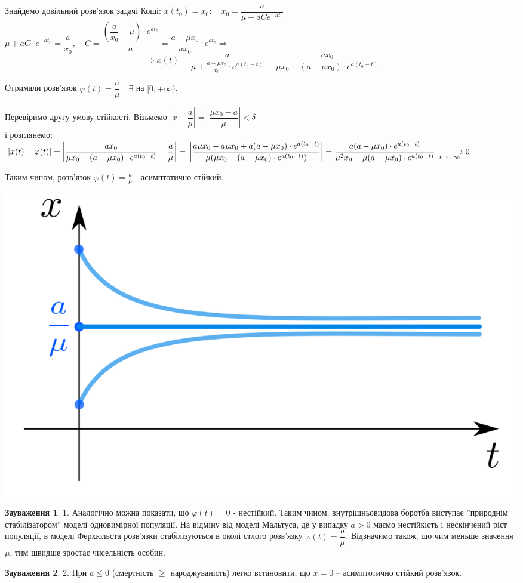 \documentclass[14pt,a4paper]{scrartcl}
\theoremstyle{definition}
\newtheorem*{remark}{Зауваження}
\theoremstyle{definition}
\theoremstyle{definition}
\begin{document}
Знайдемо довільний розв'язок задачі Коші: $x(t_0) = x_0: \quad x_0 = \dfrac{a}{\mu + aCe^{-at_0}}$\\
$\mu + aC\cdot e^{-at_0} = \dfrac{a}{x_0}, \quad C = \dfrac{\left( \dfrac{a}{x_0} - \mu  \right)\cdot e^{at_0} }{a} = \dfrac{a - \mu x_0}{ax_0}\cdot e^{at_0} \Longrightarrow$
$$
\Longrightarrow x(t) = \dfrac{a}{ \mu + \frac{a - \mu x_0}{x_0} \cdot e^{a(t_0 - t)} } = \dfrac{ax_0}{ \mu x_0 - (a - \mu x_0 ) \cdot e^{a(t_0-t)}}
$$

Отримали розв'язок $ \varphi (t) = \dfrac{a}{\mu} \quad \exists $  на $[0, + \infty)$.
\begin{spacing}{3}
  Перевіримо другу умову стійкості. Візьмемо $ \left| x - \dfrac{a}{\mu} \right| = \left| \dfrac{\mu x_0 - a}{\mu}  \right| < \delta $
  \\ і розглянемо: $
  \left| x(t) - \varphi(t) \right| = \left| \dfrac{ax_0}{\mu x_0 - (a - \mu x_0) \cdot e^{a (t_0 - t)}}  - \dfrac{a}{ \mu}  \right| = \\ \left| \dfrac{a\mu x_0 - a\mu x_0 + a (a - \mu x_0 )\cdot e^{a(t_0 - t)}}{\mu (\mu x_0 - (a- \mu x_0)\cdot e^{a(t_0 -t)})}  \right| = \dfrac{a (a - \mu x_0)\cdot e^{a (t_0 - t)}}{ \mu^2 x_0 - \mu (a- \mu x_0) \cdot e^{a(t_0 - t)}} \xrightarrow[t\to +\infty]{} 0$
\end{spacing}


Таким чином, розв'язок $\varphi(t) = \frac{a}{\mu}$ - асимптотично стійкий.
\begin{center} \includegraphics[scale=0.3]{assets/lectures_recent-0b98e3f0.png} \end{center}
\begin{remark}
    1. Аналогічно можна показати, що $\varphi (t) = 0$ - нестійкий. Таким чином, внутрішньовидова боротба виступає ''природнім стабілізатором'' моделі одновимірної популяції. На відміну від моделі Мальтуса, де у випадку $ a > 0$ маємо нестійкість і нескінчений ріст популяції, в моделі Ферхюльста розв'язки стабілізуються в околі стлого розв'язку $\varphi(t) = \dfrac{a}{\mu}.$ Відзначимо також, що чим меньше значення $\mu$, тим швидше зростає чисельність особин.
\end{remark}
\begin{remark}
    2. При $ a\leq 0$ (смертність $\geq$  народжуваність) легко встановити, що $ x=0 $ -- асимптотично стійкий розв'язок.
\end{remark}
\end{document}
